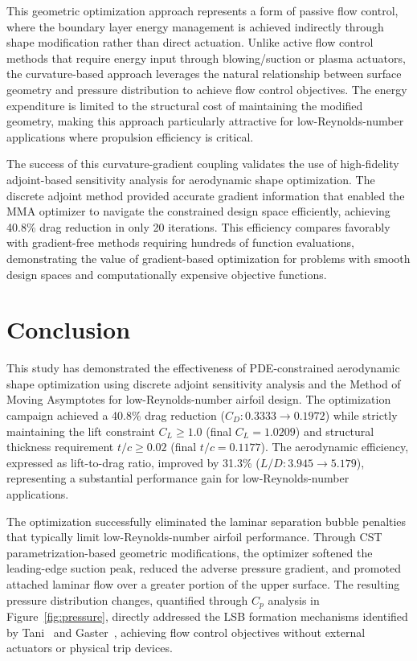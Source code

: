 This geometric optimization approach represents a form of passive flow control, where the boundary layer energy management is achieved indirectly through shape modification rather than direct actuation. Unlike active flow control methods that require energy input through blowing/suction or plasma actuators, the curvature-based approach leverages the natural relationship between surface geometry and pressure distribution to achieve flow control objectives. The energy expenditure is limited to the structural cost of maintaining the modified geometry, making this approach particularly attractive for low-Reynolds-number applications where propulsion efficiency is critical.

The success of this curvature-gradient coupling validates the use of high-fidelity adjoint-based sensitivity analysis for aerodynamic shape optimization. The discrete adjoint method provided accurate gradient information that enabled the MMA optimizer to navigate the constrained design space efficiently, achieving 40.8\% drag reduction in only 20 iterations. This efficiency compares favorably with gradient-free methods requiring hundreds of function evaluations, demonstrating the value of gradient-based optimization for problems with smooth design spaces and computationally expensive objective functions.

\section{Conclusion}

This study has demonstrated the effectiveness of PDE-constrained aerodynamic shape optimization using discrete adjoint sensitivity analysis and the Method of Moving Asymptotes for low-Reynolds-number airfoil design. The optimization campaign achieved a 40.8\% drag reduction ($C_D: 0.3333 \to 0.1972$) while strictly maintaining the lift constraint $C_L \ge 1.0$ (final $C_L = 1.0209$) and structural thickness requirement $t/c \ge 0.02$ (final $t/c = 0.1177$). The aerodynamic efficiency, expressed as lift-to-drag ratio, improved by 31.3\% ($L/D: 3.945 \to 5.179$), representing a substantial performance gain for low-Reynolds-number applications.

The optimization successfully eliminated the laminar separation bubble penalties that typically limit low-Reynolds-number airfoil performance. Through CST parametrization-based geometric modifications, the optimizer softened the leading-edge suction peak, reduced the adverse pressure gradient, and promoted attached laminar flow over a greater portion of the upper surface. The resulting pressure distribution changes, quantified through $C_p$ analysis in Figure~\ref{fig:pressure}, directly addressed the LSB formation mechanisms identified by Tani~\cite{tani1964} and Gaster~\cite{gaster1967}, achieving flow control objectives without external actuators or physical trip devices.

